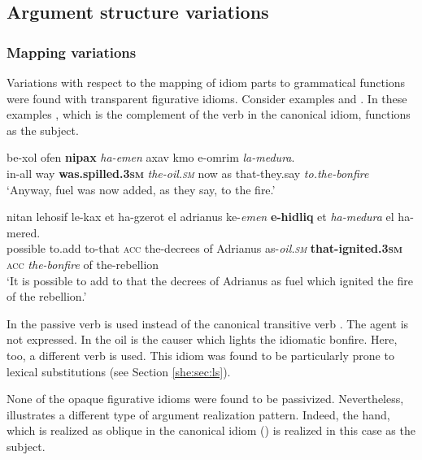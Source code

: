 \documentclass[output=paper]{langsci/langscibook}
\begin{document}
\subsection{Argument structure variations}
\label{she:sec:asv}

\subsubsection{Mapping variations}
\label{she:sec:mapping}


Variations with respect to the mapping of idiom parts to grammatical functions were found with transparent figurative idioms. Consider examples  and . In these examples , which is the complement of the verb in the canonical idiom, functions as the subject.

	\ea\label{she:medura-passive}
    	\gll be-xol {\alef}ofen \textbf{ni{\shinB}pax} \textit{ha-{\shin}emen} {\ayin}ax{\shin}av kmo {\shin}e-{\alef}omrim \textit{la-medura}.\\
    	   in-all way \textbf{was.spilled.\textsc{3sm}} \textit{the-oil.\textsc{sm}} now as that-they.say \textit{to.the-bonfire}\\
    	\glt `Anyway, fuel was now added, as they say, to the fire.'
	\z

	\ea\label{she:medura-rev}
    	\gll nitan lehosif le-kax {\alef}et ha-gzerot {\shin}el {\alef}adri{\alef}anus ke-\textit{{\shin}emen} \textbf{{\shinB}e-hidliq} {\alef}et \textit{ha-medura} {\shin}el ha-mered.\\
    	   possible to.add to-that \textsc{acc} the-decrees of Adrianus as-\textit{oil.\textsc{sm}} \textbf{that-ignited.\textsc{3sm}} \textsc{acc} \textit{the-bonfire} of the-rebellion \\
    	\glt `It is possible to add to that the decrees of Adrianus as fuel which ignited the fire of the rebellion.'
	\z

In  the passive verb  is used instead of the canonical transitive verb . The agent is not expressed. In  the oil is the causer which lights the idiomatic bonfire. Here, too, a different verb is used. This idiom was found to be particularly prone to lexical substitutions (see Section \ref{she:sec:ls}).

None of the opaque figurative idioms were found to be passivized. Nevertheless,  illustrates a different type of argument realization pattern. Indeed, the hand, which is realized as oblique in the canonical idiom () is realized in this case as the subject.
\end{document}
